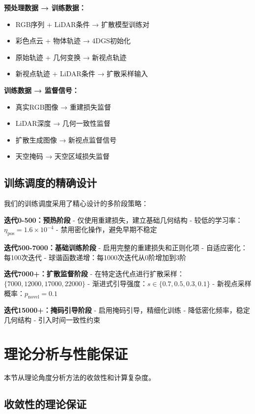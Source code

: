\textbf{预处理数据 → 训练数据：}
\begin{itemize}
\item RGB序列 + LiDAR条件 → 扩散模型训练对
\item 彩色点云 + 物体轨迹 → 4DGS初始化
\item 原始轨迹 + 几何变换 → 新视点轨迹
\item 新视点轨迹 + LiDAR条件 → 扩散采样输入
\end{itemize}

\textbf{训练数据 → 监督信号：}
\begin{itemize}
\item 真实RGB图像 → 重建损失监督
\item LiDAR深度 → 几何一致性监督  
\item 扩散生成图像 → 新视点监督信号
\item 天空掩码 → 天空区域损失监督
\end{itemize}

\subsection{训练调度的精确设计}

我们的训练调度采用了精心设计的多阶段策略：

\textbf{迭代0-500：预热阶段}
- 仅使用重建损失，建立基础几何结构
- 较低的学习率：$\eta_{\text{pos}} = 1.6 \times 10^{-4}$
- 禁用密化操作，避免早期不稳定

\textbf{迭代500-7000：基础训练阶段}  
- 启用完整的重建损失和正则化项
- 自适应密化：每100次迭代
- 球谐函数递增：每1000次迭代从0阶增加到3阶

\textbf{迭代7000+：扩散监督阶段}
- 在特定迭代点进行扩散采样：$\{7000, 12000, 17000, 22000\}$
- 渐进式引导强度：$s \in \{0.7, 0.5, 0.3, 0.1\}$
- 新视点采样概率：$p_{\text{novel}} = 0.1$

\textbf{迭代15000+：掩码引导阶段}
- 启用掩码引导，精细化训练
- 降低密化频率，稳定几何结构
- 引入时间一致性约束

\section{理论分析与性能保证}

本节从理论角度分析方法的收敛性和计算复杂度。

\subsection{收敛性的理论保证}

